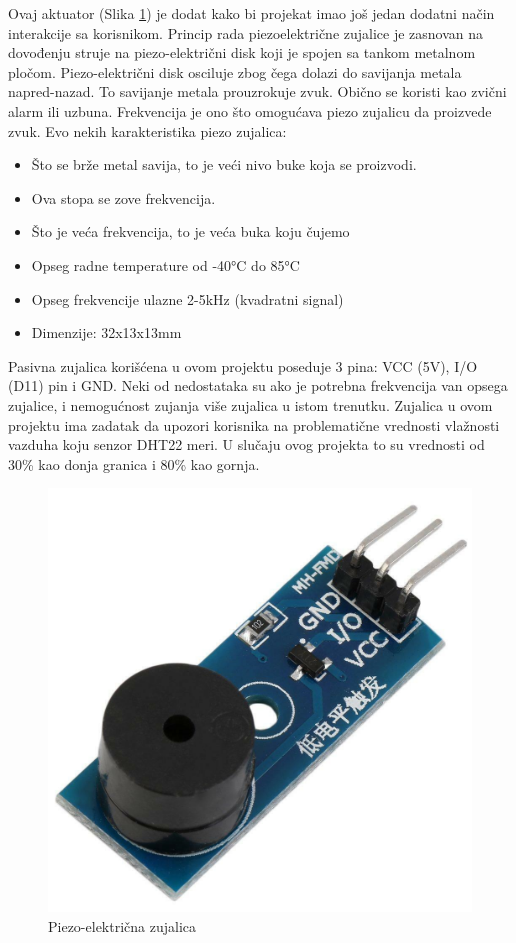 \documentclass[a4paper, 12pt]{article}
\begin{document}
	Ovaj aktuator (Slika \ref{fig:buzzer}) je dodat kako bi projekat imao još jedan dodatni način interakcije sa korisnikom. Princip rada piezoelektrične zujalice je zasnovan na dovođenju struje na piezo-električni disk koji je spojen sa tankom metalnom pločom. Piezo-električni disk osciluje zbog čega dolazi do savijanja metala napred-nazad. To savijanje metala prouzrokuje zvuk. Obično se koristi kao zvični alarm ili uzbuna. Frekvencija je ono što omogućava piezo zujalicu da proizvede zvuk. Evo nekih karakteristika piezo zujalica:
\begin{itemize}
	\item Što se brže metal savija, to je veći nivo buke koja se proizvodi.
	\item Ova stopa se zove frekvencija.
	\item Što je veća frekvencija, to je veća buka koju čujemo
	\item Opseg radne temperature od -40°C do 85°C
	\item Opseg frekvencije ulazne 2-5kHz (kvadratni signal)
	\item Dimenzije: 32x13x13mm
\end{itemize}

\vspace{10pt}

	Pasivna zujalica korišćena u ovom projektu poseduje 3 pina: VCC (5V), I/O (D11) pin i GND. Neki od nedostataka su ako je potrebna frekvencija van opsega zujalice, i nemogućnost zujanja više zujalica u istom trenutku. Zujalica u ovom projektu ima zadatak da upozori korisnika na problematične vrednosti vlažnosti vazduha koju senzor DHT22 meri. U slučaju ovog projekta to su vrednosti od 30\% kao donja granica i 80\% kao gornja.
	
\begin{figure}[H]
\centering
\includegraphics[scale=0.2]{images/buzzer}
\caption{Piezo-električna zujalica} \label{fig:buzzer}
\end{figure}
\end{document}

